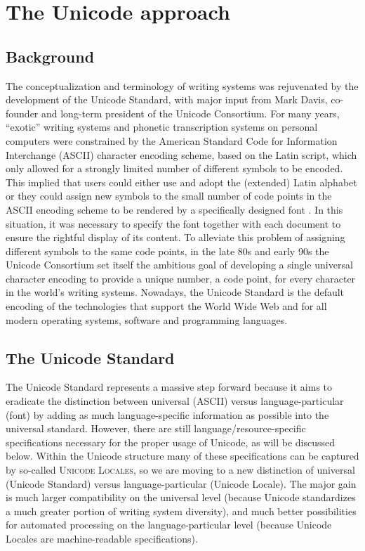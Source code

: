 \chapter{The Unicode approach}
\label{the-unicode-approach}

\section{Background}

The conceptualization and terminology of writing systems was rejuvenated by
the development of the Unicode Standard, with major input from Mark Davis,
co-founder and long-term president of the Unicode Consortium. For many years,
``exotic'' writing systems and phonetic transcription systems on personal
computers were constrained by the American Standard Code for Information
Interchange (ASCII) character encoding scheme, based on the Latin script, which
only allowed for a strongly limited number of different symbols to be encoded.
This implied that users could either use and adopt the (extended) Latin alphabet
or they could assign new symbols to the small number of code points in the ASCII
encoding scheme to be rendered by a specifically designed font
\citep{BirdSimons2003}. In this situation, it was necessary to specify the font
together with each document to ensure the rightful display of its content. To
alleviate this problem of assigning different symbols to the same code points,
in the late 80s and early 90s the Unicode Consortium set itself the ambitious
goal of developing a single universal character encoding to provide a unique
number, a code point, for every character in the world's writing systems.
Nowadays, the Unicode Standard is the default encoding of the technologies that
support the World Wide Web and for all modern operating systems, software and
programming languages.

\section{The Unicode Standard}

The Unicode Standard represents a massive step forward because it aims to
eradicate the distinction between universal (ASCII) versus language-particular
(font) by adding as much language-specific information as possible into the
universal standard. However, there are still language/resource-specific
specifications necessary for the proper usage of Unicode, as will be discussed
below. Within the Unicode structure many of these specifications can be captured
by so-called \textsc{Unicode Locales}, so we are moving to a new distinction
of universal (Unicode Standard) versus language-particular (Unicode Locale).
The major gain is much larger compatibility on the universal level (because
Unicode standardizes a much greater portion of writing system diversity), and
much better possibilities for automated processing on the language-particular
level (because Unicode Locales are machine-readable specifications).


